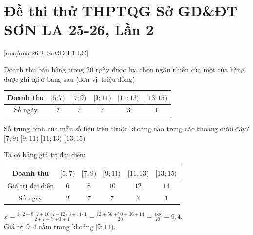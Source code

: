 \section*{Đề thi thử THPTQG Sở GD\&ĐT SƠN LA 25-26, Lần 2}

\caulc
{}[ans/ans-26-2--SoGD-L1-LC]

\begin{ex} %
	Doanh thu bán hàng trong $20$ ngày được lựa chọn ngẫu nhiên của một cửa hàng được ghi lại ở bảng sau (đơn vị: triệu đồng):
	\begin{center}
		\begin{tabular}{|c|c|c|c|c|c|}
			\hline
			Doanh thu & $[5;7)$ & $[7;9)$ & $[9;11)$ & $[11;13)$ & $[13;15)$ \\
			\hline
			Số ngày & $2$ & $7$ & $7$ & $3$ & $1$ \\
			\hline
		\end{tabular}
	\end{center}
	Số trung bình của mẫu số liệu trên thuộc khoảng nào trong các khoảng dưới đây?
	\choice
	{$[7;9)$}
	{\True $[9;11)$}
	{$[11;13)$}
	{$[13;15)$}
	\loigiai
	{
		Ta có bảng giá trị đại diện:\\
		\begin{center}
			\begin{tabular}{|c|c|c|c|c|c|}
				\hline
				Doanh thu & $[5;7)$ & $[7;9)$ & $[9;11)$ & $[11;13)$ & $[13;15)$ \\
				\hline
				Giá trị đại diện & $6$ & $8$ & $10$ & $12$ & $14$ \\
				\hline
				Số ngày & $2$ & $7$ & $7$ & $3$ & $1$ \\
				\hline
			\end{tabular}
		\end{center}
		$\displaystyle \bar{x} = \frac{6 \cdot 2 + 8 \cdot 7 + 10 \cdot 7 + 12 \cdot 3 + 14 \cdot 1}{2+7+7+3+1} = \frac{12+56+70+36+14}{20} = \frac{188}{20} = 9{,}4$.\\
		Giá trị $9{,}4$ nằm trong khoảng $[9;11)$.
	}
\end{ex}

